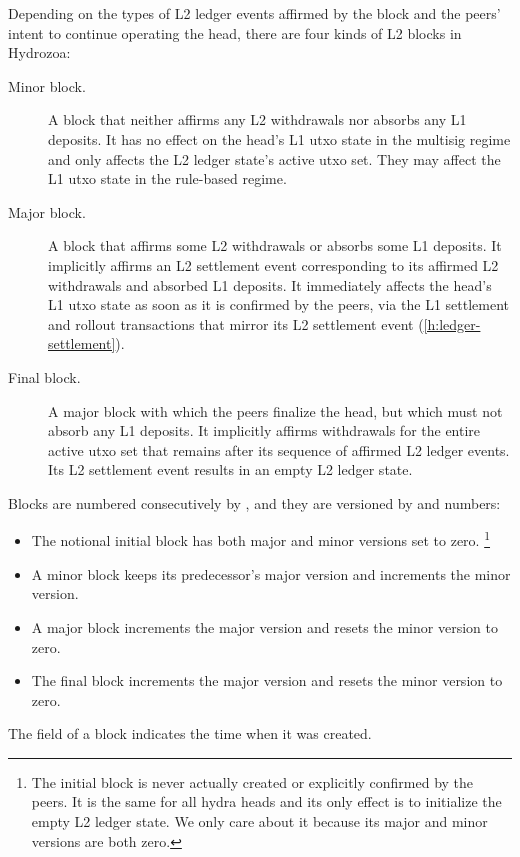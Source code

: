\documentclass[../hydrozoa.tex]{subfiles}
\begin{document}
Depending on the types of L2 ledger events affirmed by the block and the peers' intent to continue operating the head, there are four kinds of L2 blocks in Hydrozoa:
\begin{description}
  \item[Minor block.] A block that neither affirms any L2 withdrawals nor absorbs any L1 deposits.
    It has no effect on the head's L1 utxo state in the multisig regime and only affects the L2 ledger state's active utxo set.
    They may affect the L1 utxo state in the rule-based regime.
  \item[Major block.] A block that affirms some L2 withdrawals or absorbs some L1 deposits.
    It implicitly affirms an L2 settlement event corresponding to its affirmed L2 withdrawals and absorbed L1 deposits.
    It immediately affects the head's L1 utxo state as soon as it is confirmed by the peers, via the L1 settlement and rollout transactions that mirror its L2 settlement event (\cref{h:ledger-settlement}).
  \item[Final block.] A major block with which the peers finalize the head, but which must not absorb any L1 deposits.
    It implicitly affirms withdrawals for the entire active utxo set that remains after its sequence of affirmed L2 ledger events.
    Its L2 settlement event results in an empty L2 ledger state.
\end{description}

Blocks are numbered consecutively by , and they are versioned by  and  numbers:
\begin{itemize}
  \item The notional initial block has both major and minor versions set to zero.%
    \footnote{The initial block is never actually created or explicitly confirmed by the peers.
      It is the same for all hydra heads and its only effect is to initialize the empty L2 ledger state.
      We only care about it because its major and minor versions are both zero.}
  \item A minor block keeps its predecessor's major version and increments the minor version.
  \item A major block increments the major version and resets the minor version to zero.
  \item The final block increments the major version and resets the minor version to zero.
\end{itemize}

The  field of a block indicates the time when it was created.
\end{document}
